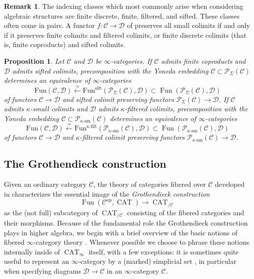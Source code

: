 \documentclass[12pt]{article}
\newtheorem{proposition}{Proposition}[subsection]
\theoremstyle{definition}
\newtheorem{remark}{Remark}[subsection]
\newcommand{\C}{\mathcal{C}}
\newcommand{\D}{\mathcal{D}}
\renewcommand{\P}{\mathcal{P}}
\renewcommand{\i}{\infty}
\newcommand{\too}{\longrightarrow}
\newcommand{\from}{\longleftarrow}
\newcommand{\op}{\mathrm{op}}
\DeclareMathOperator{\CAT}{CAT}
\DeclareMathOperator{\Fun}{Fun}
\begin{document}
\begin{remark}
The indexing classes which most commonly arise when considering algebraic structures are finite discrete, finite, filtered, and sifted.
These classes often come in pairs.
A functor $f:\C\to\D$ of preserves all small colimits if and only if it preserves finite colimits and filtered colimits, or finite discrete colimits (that is, finite coproducts) and sifted colimits.
\end{remark}


\begin{proposition}{\em \cite[Proposition 5.3.6.2]{HTT}}\label{prop:fc}
Let ${\mathcal{C}}$ and $\D$ be ${\infty}$-categories.
If $\C$ admits finite coproducts and ${\mathcal{D}}$ admits sifted colimits, precomposition with the Yoneda embedding $\C\subset\P_\Sigma(\C)$ determines an equivalence of $\i$-categories
\[
\mathrm{Fun}(\mathcal{C}, \mathcal{D})\overset{\simeq}{\from}\mathrm{Fun^{\mathrm{sift}}}(\P_\Sigma(\C), \mathcal{D}) \subset\Fun(\P_\Sigma(\C),\D)
\]
of functors $\C\to\D$ and sifted colimit preserving functors ${\P_\Sigma(\C) \rightarrow \mathcal{D}}$.
If $\C$ admits $\kappa$-small colimits and $\D$ admits $\kappa$-filtered colimits, precomposition with the Yoneda embedding $\C\subset\P_{\kappa\textrm{-}\mathrm{sm}}(\C)$ determines an equivalence of $\i$-categories
\[
\mathrm{Fun}(\mathcal{C}, \mathcal{D})\overset{\simeq}{\from}\mathrm{Fun^{\kappa\textrm{-}\mathrm{filt}}}(\P_{\kappa\textrm{-}\mathrm{sm}}(\C), \mathcal{D}) \subset\Fun(\P_{\kappa\textrm{-}\mathrm{sm}}(\C),\D)
\]
of functors $\C\to\D$ and $\kappa$-filtered colimit preserving functors ${\P_{\kappa\textrm{-}\mathrm{sm}}(\C) \rightarrow \mathcal{D}}$.
\end{proposition}


\subsection{The Grothendieck construction}\label{sec:GC}

Given an ordinary category $\C$, the theory of categories fibered over $\C$ developed in \cite{SGA1} characterizes the essential image of the {\em Grothendieck construction}
\[
\Fun(\C^{\op},\CAT)\too\CAT_{/\C}
\]
as the (not full) subcategory of $\CAT_{/\C}$ consisting of the fibered categories and their morphisms.
Because of the fundamental role the Grothendieck construction plays in higher algebra, we begin with a brief overview of the basic notions of fibered $\i$-category theory \cite{HTT}.
Whenever possible we choose to phrase these notions internally inside of $\CAT_\i$ itself, with a few exceptions: it is sometimes quite useful to represent an $\i$-category by a (marked) simplicial set \cite{HTT}, in particular when specifying diagrams $\D\to\C$ in an $\i$-category $\C$.
\end{document}
